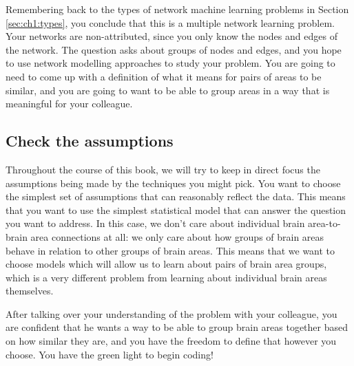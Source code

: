 Remembering back to the types of network machine learning problems in Section \ref{sec:ch1:types}, you conclude that this is a multiple network learning problem. Your networks are non-attributed, since you only know the nodes and edges of the network. The question asks about groups of nodes and edges, and you hope to use network modelling approaches to study your problem. You are going to need to come up with a definition of what it means for pairs of areas to be similar, and you are going to want to be able to group areas in a way that is meaningful for your colleague.

\subsection{Check the assumptions}

Throughout the course of this book, we will try to keep in direct focus the assumptions being made by the techniques you might pick. You want to choose the simplest set of assumptions that can reasonably reflect the data. This means that you want to use the simplest statistical model that can answer the question you want to address. In this case, we don't care about individual brain area-to-brain area connections at all: we only care about how groups of brain areas behave in relation to other groups of brain areas. This means that we want to choose models which will allow us to learn about pairs of brain area groups, which is a very different problem from learning about individual brain areas themselves.

After talking over your understanding of the problem with your colleague, you are confident that he wants a way to be able to group brain areas together based on how similar they are, and you have the freedom to define that however you choose. You have the green light to begin coding!

\newpage